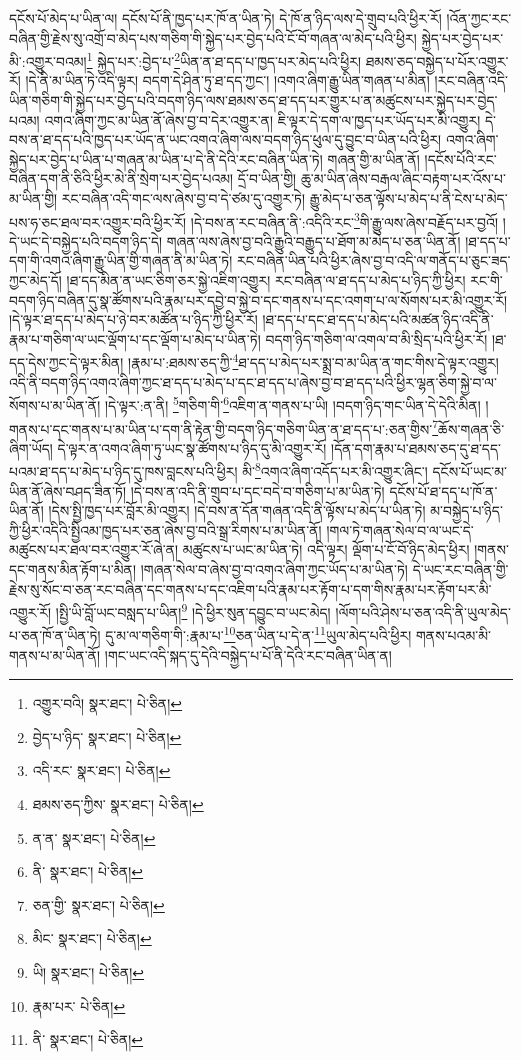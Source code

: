 དངོས་པོ་མེད་པ་ཡིན་ལ། དངོས་པོ་ནི་ཁྱད་པར་ཁོ་ན་ཡིན་ཏེ། དེ་ཁོ་ན་ཉིད་ལས་དེ་གྲུབ་པའི་ཕྱིར་རོ། །འོན་ཀྱང་རང་བཞིན་གྱི་རྗེས་སུ་འགྲོ་བ་མེད་པས་གཅིག་གི་སྐྱེད་པར་བྱེད་པའི་ངོ་བོ་གཞན་ལ་མེད་པའི་ཕྱིར། སྐྱེད་པར་བྱེད་པར་མི་:འགྱུར་བའམ།\footnote{འགྱུར་བའི།  སྣར་ཐང་།  པེ་ཅིན། } སྐྱེད་པར་:བྱེད་པ་\footnote{བྱེད་པ་ཉིད་  སྣར་ཐང་།  པེ་ཅིན། }ཡིན་ན་ཐ་དད་པ་ཁྱད་པར་མེད་པའི་ཕྱིར། ཐམས་ཅད་བསྐྱེད་པ་པོར་འགྱུར་རོ། །དེ་ནི་མ་ཡིན་ཏེ་འདི་ལྟར། བདག་དེ་ཤིན་ཏུ་ཐ་དད་ཀྱང་། །འགའ་ཞིག་རྒྱུ་ཡིན་གཞན་པ་མིན། །རང་བཞིན་འདི་ཡིན་གཅིག་གི་སྐྱེད་པར་བྱེད་པའི་བདག་ཉིད་ལས་ཐམས་ཅད་ཐ་དད་པར་གྱུར་པ་ན་མཚུངས་པར་སྐྱེད་པར་བྱེད་པའམ། འགའ་ཞིག་ཀྱང་མ་ཡིན་ནོ་ཞེས་བྱ་བ་དེར་འགྱུར་ན། ཇི་ལྟར་དེ་དག་ལ་ཁྱད་པར་ཡོད་པར་མི་འགྱུར། དེ་བས་ན་ཐ་དད་པའི་ཁྱད་པར་ཡོད་ན་ཡང་འགའ་ཞིག་ལས་བདག་ཉིད་ཕུལ་དུ་བྱུང་བ་ཡིན་པའི་ཕྱིར། འགའ་ཞིག་སྐྱེད་པར་བྱེད་པ་ཡིན་པ་གཞན་མ་ཡིན་པ་དེ་ནི་དེའི་རང་བཞིན་ཡིན་ཏེ། གཞན་གྱི་མ་ཡིན་ནོ། །དངོས་པོའི་རང་བཞིན་དག་ནི་ཅིའི་ཕྱིར་མེ་ནི་སྲེག་པར་བྱེད་པའམ། དྲོ་བ་ཡིན་གྱི། ཆུ་མ་ཡིན་ཞེས་བརྒལ་ཞིང་བརྟག་པར་འོས་པ་མ་ཡིན་གྱི། རང་བཞིན་འདི་གང་ལས་ཞེས་བྱ་བ་དེ་ཙམ་དུ་འགྱུར་ཏེ། རྒྱུ་མེད་པ་ཅན་ལྟོས་པ་མེད་པ་ནི་ངེས་པ་མེད་པས་ཧ་ཅང་ཐལ་བར་འགྱུར་བའི་ཕྱིར་རོ། །དེ་བས་ན་རང་བཞིན་ནི་:འདིའི་རང་\footnote{འདི་རང་  སྣར་ཐང་།  པེ་ཅིན། }གི་རྒྱུ་ལས་ཞེས་བརྗོད་པར་བྱའོ། །དེ་ཡང་དེ་བསྐྱེད་པའི་བདག་ཉིད་དེ། གཞན་ལས་ཞེས་བྱ་བའི་རྒྱུའི་བརྒྱུད་པ་ཐོག་མ་མེད་པ་ཅན་ཡིན་ནོ། །ཐ་དད་པ་དག་གི་འགའ་ཞིག་རྒྱུ་ཡིན་གྱི་གཞན་ནི་མ་ཡིན་ཏེ། རང་བཞིན་ཡིན་པའི་ཕྱིར་ཞེས་བྱ་བ་འདི་ལ་གནོད་པ་ཅུང་ཟད་ཀྱང་མེད་དོ། །ཐ་དད་མིན་ན་ཡང་ཅིག་ཅར་སྐྱེ་འཇིག་འགྱུར། རང་བཞིན་ལ་ཐ་དད་པ་མེད་པ་ཉིད་ཀྱི་ཕྱིར། རང་གི་བདག་ཉིད་བཞིན་དུ་སྣ་ཚོགས་པའི་རྣམ་པར་དབྱེ་བ་སྐྱེ་བ་དང་གནས་པ་དང་འགག་པ་ལ་སོགས་པར་མི་འགྱུར་རོ། །དེ་ལྟར་ཐ་དད་པ་མེད་པ་ཉེ་བར་མཚོན་པ་ཉིད་ཀྱི་ཕྱིར་རོ། །ཐ་དད་པ་དང་ཐ་དད་པ་མེད་པའི་མཚན་ཉིད་འདི་ནི་རྣམ་པ་གཅིག་ལ་ཡང་ལྡོག་པ་དང་ལྡོག་པ་མེད་པ་ཡིན་ཏེ། བདག་ཉིད་གཅིག་ལ་འགལ་བ་མི་སྲིད་པའི་ཕྱིར་རོ། །ཐ་དད་དེས་ཀྱང་དེ་ལྟར་མིན། །རྣམ་པ་:ཐམས་ཅད་ཀྱི་\footnote{ཐམས་ཅད་ཀྱིས་  སྣར་ཐང་།  པེ་ཅིན། }ཐ་དད་པ་མེད་པར་སྨྲ་བ་མ་ཡིན་ན་གང་གིས་དེ་ལྟར་འགྱུར། འདི་ནི་བདག་ཉིད་འགའ་ཞིག་ཀྱང་ཐ་དད་པ་མེད་པ་དང་ཐ་དད་པ་ཞེས་བྱ་བ་ཐ་དད་པའི་ཕྱིར་ལྷན་ཅིག་སྐྱེ་བ་ལ་སོགས་པ་མ་ཡིན་ནོ། །དེ་ལྟར་:ན་ནི། \footnote{ན་ན་  སྣར་ཐང་།  པེ་ཅིན། }གཅིག་གི་\footnote{ནི་  སྣར་ཐང་།  པེ་ཅིན། }འཇིག་ན་གནས་པ་ཡི། །བདག་ཉིད་གང་ཡིན་དེ་དེའི་མིན། །གནས་པ་དང་གནས་པ་མ་ཡིན་པ་དག་ནི་རྟེན་གྱི་བདག་ཉིད་གཅིག་ཡིན་ན་ཐ་དད་པ་:ཅན་གྱིས་\footnote{ཅན་གྱི་  སྣར་ཐང་།  པེ་ཅིན། }ཆོས་གཞན་ཅི་ཞིག་ཡོད། དེ་ལྟར་ན་འགའ་ཞིག་ཏུ་ཡང་སྣ་ཚོགས་པ་ཉིད་དུ་མི་འགྱུར་རོ། །དོན་དག་རྣམ་པ་ཐམས་ཅད་དུ་ཐ་དད་པའམ་ཐ་དད་པ་མེད་པ་ཉིད་དུ་ཁས་བླངས་པའི་ཕྱིར། མི་\footnote{མིང་  སྣར་ཐང་།  པེ་ཅིན། }འགའ་ཞིག་འདོད་པར་མི་འགྱུར་ཞིང་། དངོས་པོ་ཡང་མ་ཡིན་ནོ་ཞེས་བཤད་ཟིན་ཏོ། །དེ་བས་ན་འདི་ནི་གྲུབ་པ་དང་བདེ་བ་གཅིག་པ་མ་ཡིན་ཏེ། དངོས་པོ་ཐ་དད་པ་ཁོ་ན་ཡིན་ནོ། །དེས་སྤྱི་ཁྱད་པར་བློར་མི་འགྱུར། །དེ་བས་ན་དོན་གཞན་འདི་ནི་ལྟོས་པ་མེད་པ་ཡིན་ཏེ། མ་བསྐྱེད་པ་ཉིད་ཀྱི་ཕྱིར་འདིའི་སྤྱིའམ་ཁྱད་པར་ཅན་ཞེས་བྱ་བའི་སྒྲ་རིགས་པ་མ་ཡིན་ནོ། །གལ་ཏེ་གཞན་སེལ་བ་ལ་ཡང་དེ་མཚུངས་པར་ཐལ་བར་འགྱུར་རོ་ཞེ་ན། མཚུངས་པ་ཡང་མ་ཡིན་ཏེ། འདི་ལྟར། ལྡོག་པ་ངོ་བོ་ཉིད་མེད་ཕྱིར། །གནས་དང་གནས་མིན་རྟོག་པ་མིན། །གཞན་སེལ་བ་ཞེས་བྱ་བ་འགའ་ཞིག་ཀྱང་ཡོད་པ་མ་ཡིན་ཏེ། དེ་ཡང་རང་བཞིན་གྱི་རྗེས་སུ་སོང་བ་ཅན་རང་བཞིན་དང་གནས་པ་དང་འཇིག་པའི་རྣམ་པར་རྟོག་པ་དག་གིས་རྣམ་པར་རྟོག་པར་མི་འགྱུར་རོ། །སྤྱི་ཡི་བློ་ཡང་བསླད་པ་ཡིན།\footnote{ཡི།  སྣར་ཐང་།  པེ་ཅིན། } །དེ་ཕྱིར་སུན་དབྱུང་བ་ཡང་མེད། །ལོག་པའི་ཤེས་པ་ཅན་འདི་ནི་ཡུལ་མེད་པ་ཅན་ཁོ་ན་ཡིན་ཏེ། དུ་མ་ལ་གཅིག་གི་:རྣམ་པ་\footnote{རྣམ་པར་  པེ་ཅིན། }ཅན་ཡིན་པ་དེ་ན་\footnote{ནི་  སྣར་ཐང་།  པེ་ཅིན། }ཡུལ་མེད་པའི་ཕྱིར། གནས་པའམ་མི་གནས་པ་མ་ཡིན་ནོ། །གང་ཡང་འདི་སྐད་དུ་དེའི་བསྐྱེད་པ་པོ་ནི་དེའི་རང་བཞིན་ཡིན་ན། 
